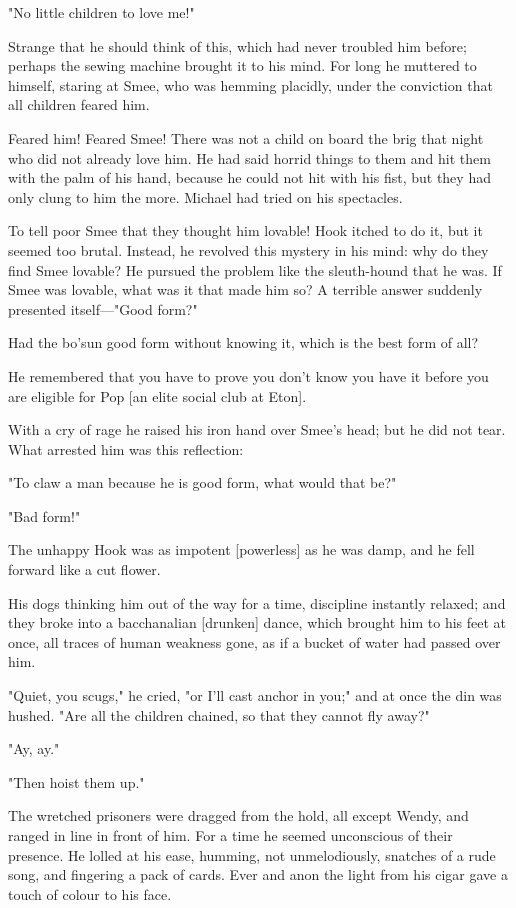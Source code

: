 "No little children to love me!"


Strange that he should think of this, which had never troubled him before;
perhaps the sewing machine brought it to his mind. For long he muttered to
himself, staring at Smee, who was hemming placidly, under the conviction
that all children feared him.


Feared him! Feared Smee! There was not a child on board the brig that
night who did not already love him. He had said horrid things to them and
hit them with the palm of his hand, because he could not hit with his
fist, but they had only clung to him the more. Michael had tried on his
spectacles.


To tell poor Smee that they thought him lovable! Hook itched to do it, but
it seemed too brutal. Instead, he revolved this mystery in his mind: why
do they find Smee lovable? He pursued the problem like the sleuth-hound
that he was. If Smee was lovable, what was it that made him so? A terrible
answer suddenly presented itself—"Good form?"


Had the bo'sun good form without knowing it, which is the best form of
all?


He remembered that you have to prove you don't know you have it before you
are eligible for Pop [an elite social club at Eton].


With a cry of rage he raised his iron hand over Smee's head; but he did
not tear. What arrested him was this reflection:


"To claw a man because he is good form, what would that be?"


"Bad form!"


The unhappy Hook was as impotent [powerless] as he was damp, and he fell
forward like a cut flower.


His dogs thinking him out of the way for a time, discipline instantly
relaxed; and they broke into a bacchanalian [drunken] dance, which brought
him to his feet at once, all traces of human weakness gone, as if a bucket
of water had passed over him.


"Quiet, you scugs," he cried, "or I'll cast anchor in you;" and at once
the din was hushed. "Are all the children chained, so that they cannot fly
away?"


"Ay, ay."


"Then hoist them up."


The wretched prisoners were dragged from the hold, all except Wendy, and
ranged in line in front of him. For a time he seemed unconscious of their
presence. He lolled at his ease, humming, not unmelodiously, snatches of a
rude song, and fingering a pack of cards. Ever and anon the light from his
cigar gave a touch of colour to his face.


